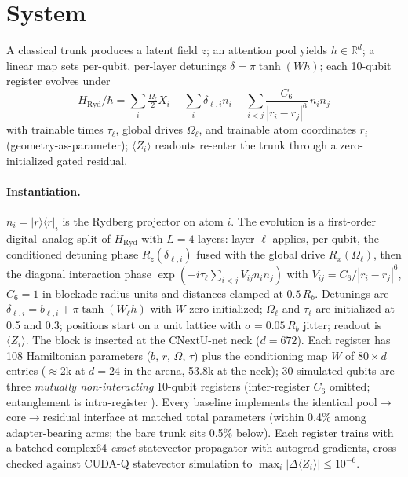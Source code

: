 \documentclass{article}
\begin{document}
\section{System}
\label{sec:system}

A classical trunk produces a latent field $z$; an attention pool yields
$h \in \mathbb{R}^d$; a linear map sets per-qubit, per-layer detunings
$\delta = \pi \tanh(W h)$; each 10-qubit register evolves under
\begin{equation*}
H_{\mathrm{Ryd}}/\hbar = \sum_i \tfrac{\Omega_\ell}{2} X_i - \sum_i
\delta_{\ell,i} n_i + \sum_{i<j} \frac{C_6}{|r_i - r_j|^{6}}\, n_i n_j
\end{equation*}
with trainable times $\tau_\ell$, global drives $\Omega_\ell$, and trainable
atom coordinates $r_i$ (geometry-as-parameter); $\langle Z_i \rangle$
readouts re-enter the trunk through a zero-initialized gated residual.

\paragraph{Instantiation.} $n_i = |r\rangle\langle r|_i$ is the Rydberg
projector on atom $i$. The evolution is a first-order digital--analog split
of $H_{\mathrm{Ryd}}$ with $L{=}4$ layers: layer $\ell$ applies, per
qubit, the conditioned detuning phase $R_z(\delta_{\ell,i})$ fused with the
global drive $R_x(\Omega_\ell)$, then the diagonal interaction phase
$\exp(-i\tau_\ell \sum_{i<j} V_{ij} n_i n_j)$ with
$V_{ij} = C_6/|r_i - r_j|^6$, $C_6 = 1$ in blockade-radius units and
distances clamped at $0.5\,R_b$. Detunings are
$\delta_{\ell,i} = b_{\ell,i} + \pi\tanh(W_\ell h)$ with $W$ zero-initialized;
$\Omega_\ell$ and $\tau_\ell$ are initialized at 0.5 and 0.3; positions
start on a unit lattice with $\sigma{=}0.05\,R_b$ jitter; readout is
$\langle Z_i\rangle$. The block is inserted at the CNextU-net neck
($d{=}672$). Each register has 108 Hamiltonian parameters ($b$, $r$,
$\Omega$, $\tau$) plus the conditioning map $W$ of $80 \times d$ entries
($\approx$2k at $d{=}24$ in the arena, 53.8k at the neck); 30 simulated
qubits are three \emph{mutually non-interacting} 10-qubit registers
(inter-register $C_6$ omitted; entanglement is intra-register
\citep{huang2020patchgan}). Every baseline
implements the identical pool$\to$core$\to$residual interface at matched
total parameters (within 0.4\% among adapter-bearing arms; the bare trunk
sits 0.5\% below). Each register trains with a batched complex64
\emph{exact} statevector propagator with autograd gradients, cross-checked
against CUDA-Q statevector simulation to $\max_i |\Delta\langle Z_i\rangle|
\le 10^{-6}$.
\end{document}
